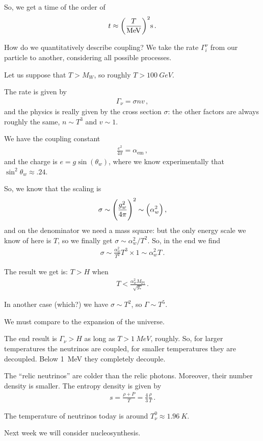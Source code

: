 \documentclass[main.tex]{subfiles}
\begin{document}
So, we get a time of the order of 
%
\begin{align}
t \approx \qty( \frac{T}{\SI{}{MeV}})^2 \SI{}{s}
\,.
\end{align}

How do we quantitatively describe coupling? We take the rate \(\Gamma_{i}^{\nu }\) from our particle to another, considering all possible processes.

Let us suppose that \(T > M_W\), so roughly \(T > \SI{100}{GeV}\).

The rate is given by 
%
\begin{align}
\Gamma_{\nu } = \sigma n v 
\,,
\end{align}
%
and the physics is really given by the cross section \(\sigma \): the other factors are always roughly the same, \(n \sim T^{3}\) and \(v \sim 1\).

We have the coupling constant 
%
\begin{align}
\frac{e^2}{4 \pi } = \alpha _{\text{em}}
\,,
\end{align}
%
and the charge is \(e = g \sin(\theta_{w})\), where we know experimentally that \(\sin^2\theta_{w} \approx \num{.24}\).

So, we know that the scaling is 
%
\begin{align}
\sigma \sim \qty( \frac{g^2_{w}}{4 \pi })^{2}
\sim \qty(\alpha^2_{w})
\,,
\end{align}
%
and on the denominator we need a mass square: but the only energy scale we know of here is \(T\), so we finally get \(\sigma \sim \alpha^2_{w} / T^2\). So, in the end we find 
%
\begin{align}
\sigma \sim \frac{\alpha^2_{w}}{T^2} T^3 \times 1 \sim \alpha^2_{w} T
\,.
\end{align}

The result we get is: \(T > H\) when 
%
\begin{align}
T < \frac{\alpha^2_{w }M _{\text{Pl}}}{\sqrt{g_{*}}}
\,.
\end{align}

In another case (which?) we have \(\sigma \sim T^{2}\), so \(\Gamma \sim T^{5}\). 

We must compare to the expansion of the universe. 

The end result is \(\Gamma_{\nu } > H\) as long as \(T > \SI{1}{MeV}\), roughly. So, for larger temperatures the neutrinos are coupled, for smaller temperatures they are decoupled. Below \SI{1}{MeV} they completely decouple. 

The ``relic neutrinos'' are colder than the relic photons. Moreover, their number density is smaller. 
The entropy density is given by 
%
\begin{align}
s = \frac{\rho + P}{T} = \frac{4}{3} \frac{\rho}{T}
\,.
\end{align}

The temperature of neutrinos today is around \(T^{0}_{\nu } \approx \SI{1.96}{K}\). 

Next week we will consider nucleosynthesis. 
\end{document}
